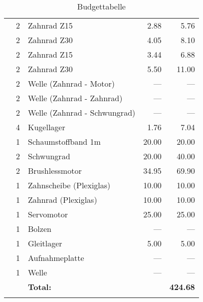 \begin{longtable}{p{1.7cm}rlrr}
               & 2     & Zahnrad Z15                  &   2.88 &   5.76 \\
               & 2     & Zahnrad Z30                  &   4.05 &   8.10 \\
               & 2     & Zahnrad Z15                  &   3.44 &   6.88 \\
               & 2     & Zahnrad Z30                  &   5.50 &  11.00 \\
               & 2     & Welle (Zahnrad - Motor)      &  {---} &  {---} \\
               & 2     & Welle (Zahnrad - Zahnrad)    &  {---} &  {---} \\
               & 2     & Welle (Zahnrad - Schwungrad) &  {---} &  {---} \\
               & 4     & Kugellager                   &   1.76 &   7.04 \\
               & 1     & Schaumstoffband 1m           &  20.00 &  20.00 \\
               & 2     & Schwungrad                   &  20.00 &  40.00 \\
               & 2     & Brushlessmotor               &  34.95 &  69.90 \\
    \newpage
               & 1     & Zahnscheibe (Plexiglas)      &  10.00 &  10.00 \\
               & 1     & Zahnrad (Plexiglas)          &  10.00 &  10.00 \\
               & 1     & Servomotor                   &  25.00 &  25.00 \\
               & 1     & Bolzen                       &  {---} &  {---} \\
               & 1     & Gleitlager                   &   5.00 &   5.00 \\
               & 1     & Aufnahmeplatte               &  {---} &  {---} \\
               & 1     & Welle                        &  {---} &  {---} \\
               &       & \textbf{Total:} &            & \textbf{424.68} \\
       \caption{Budgettabelle}
       \label{tab:Kostentabelle}
    \end{longtable}
